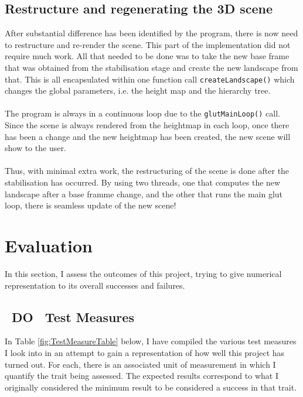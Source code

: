 \documentclass[11pt]{article}
\begin{document}
\subsection{Restructure and regenerating the 3D scene}
After substantial difference has been identified by the program, there is
now need to restructure and re-render the scene. This part of
the implementation did not require much work. All that needed to be done was
to take the new base frame that was obtained from the stabilisation
stage and create the new landscape from that. This is all encapsulated 
within one function call \texttt{createLandscape()} which changes
the global parameters, i.e. the height map and the hierarchy tree.\\
\\
The program is always in a continuous loop due to the \texttt{glutMainLoop()}
call. Since the scene is always rendered from the heightmap in each 
loop, once there has been a change and the new heightmap has been created,
the new scene will show to the user.\\
\\
Thus, with minimal extra work, the restructuring of the scene is done
after the stabilisation has occurred. By using two threads, one that
computes the new landscape after a base framme change, and the other
that runs the main glut loop, there is seamless update of the new
scene!

\section{Evaluation}
\label{chapter:evaluation}
In this section, I assess the outcomes of this project, trying to 
give numerical representation to its overall successes and failures.

\subsection{~DO~ Test Measures}
In Table \ref{fig:TestMeasureTable} below, I have compiled the various 
test measures I look into in an attempt to gain a representation of how 
well this project has turned out. For each, there is an associated 
unit of measurement in which I quantify the trait being assessed. 
The expected results correspond to what I originally considered the 
minimum result to be considered a success in that trait.
\end{document}
